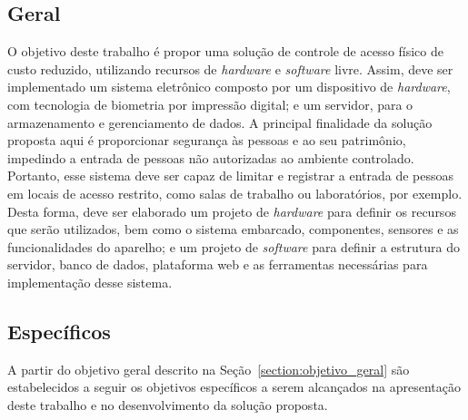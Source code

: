 \subsection{Geral\label{section:objetivo_geral}}

 O objetivo deste trabalho é propor uma solução de controle de acesso físico de custo reduzido, utilizando recursos de \textit{hardware} e \textit{software} livre. Assim, deve ser implementado um sistema eletrônico composto por um dispositivo de \textit{hardware}, com tecnologia de biometria por impressão digital; e um servidor, para o armazenamento e gerenciamento de dados. A principal finalidade da solução proposta aqui é proporcionar segurança às pessoas e ao seu patrimônio, impedindo a entrada de pessoas não autorizadas ao ambiente controlado. Portanto, esse sistema deve ser capaz de limitar e registrar a entrada de pessoas em locais de acesso restrito, como salas de trabalho ou laboratórios, por exemplo. Desta forma, deve ser elaborado um projeto de \textit{hardware} para definir os recursos que serão utilizados, bem como o sistema embarcado, componentes, sensores e as funcionalidades do aparelho; e um projeto de \textit{software} para definir a estrutura do servidor, banco de dados, plataforma web e as ferramentas necessárias para implementação desse sistema.


\subsection{Específicos}                        

A partir do objetivo geral descrito na Seção~\ref{section:objetivo_geral} são estabelecidos a seguir os objetivos específicos a serem alcançados na apresentação deste trabalho e no desenvolvimento da solução proposta.

